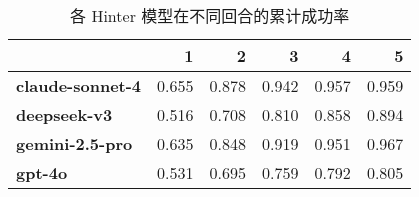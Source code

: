 \begin{table}
\caption{各 Hinter 模型在不同回合的累计成功率}
\label{tab:cum_success_hinter}
\begin{tabular}{lrrrrr}
\toprule
 & 1 & 2 & 3 & 4 & 5 \\
\midrule
\textbf{claude-sonnet-4} & 0.655 & 0.878 & 0.942 & 0.957 & 0.959 \\
\textbf{deepseek-v3} & 0.516 & 0.708 & 0.810 & 0.858 & 0.894 \\
\textbf{gemini-2.5-pro} & 0.635 & 0.848 & 0.919 & 0.951 & 0.967 \\
\textbf{gpt-4o} & 0.531 & 0.695 & 0.759 & 0.792 & 0.805 \\
\bottomrule
\end{tabular}
\end{table}
